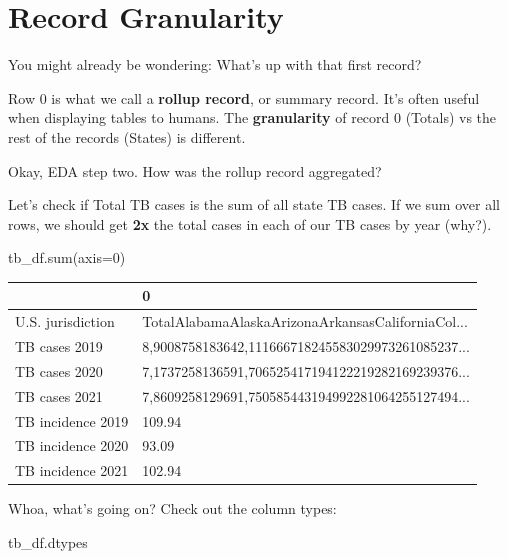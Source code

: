 \documentclass[
  letterpaper,
  DIV=11,
  numbers=noendperiod]{scrreprt}
\newenvironment{Shaded}{\begin{snugshade}}{\end{snugshade}}
\newcommand{\BuiltInTok}[1]{\textcolor[rgb]{0.00,0.23,0.31}{#1}}
\newcommand{\DecValTok}[1]{\textcolor[rgb]{0.68,0.00,0.00}{#1}}
\newcommand{\NormalTok}[1]{\textcolor[rgb]{0.00,0.23,0.31}{#1}}
\newcommand{\OperatorTok}[1]{\textcolor[rgb]{0.37,0.37,0.37}{#1}}
\begin{document}
\hypertarget{record-granularity}{%
\section{Record Granularity}\label{record-granularity}}

You might already be wondering: What's up with that first record?

Row 0 is what we call a \textbf{rollup record}, or summary record. It's
often useful when displaying tables to humans. The \textbf{granularity}
of record 0 (Totals) vs the rest of the records (States) is different.

Okay, EDA step two. How was the rollup record aggregated?

Let's check if Total TB cases is the sum of all state TB cases. If we
sum over all rows, we should get \textbf{2x} the total cases in each of
our TB cases by year (why?).

\begin{Shaded}
\begin{Highlighting}[]
\NormalTok{tb\_df.}\BuiltInTok{sum}\NormalTok{(axis}\OperatorTok{=}\DecValTok{0}\NormalTok{)}
\end{Highlighting}
\end{Shaded}

\begin{tabular}{ll}
\toprule
{} &                                                  0 \\
\midrule
U.S. jurisdiction &  TotalAlabamaAlaskaArizonaArkansasCaliforniaCol... \\
TB cases 2019     &  8,9008758183642,111666718245583029973261085237... \\
TB cases 2020     &  7,1737258136591,706525417194122219282169239376... \\
TB cases 2021     &  7,8609258129691,750585443194992281064255127494... \\
TB incidence 2019 &                                             109.94 \\
TB incidence 2020 &                                              93.09 \\
TB incidence 2021 &                                             102.94 \\
\bottomrule
\end{tabular}

Whoa, what's going on? Check out the column types:

\begin{Shaded}
\begin{Highlighting}[]
\NormalTok{tb\_df.dtypes}
\end{Highlighting}
\end{Shaded}
\end{document}
